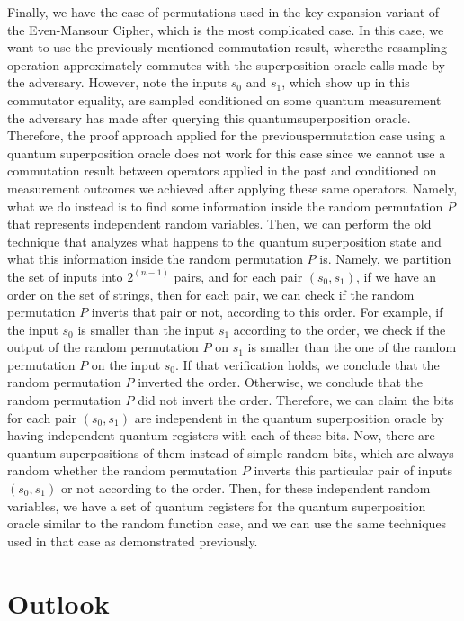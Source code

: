 \documentclass[12pt]{article}
\begin{document}
    Finally, we have the case of permutations used in the key expansion variant of the Even-Mansour Cipher, which is the most complicated case. In this case, we want to use the previously mentioned commutation result, where\break the resampling operation approximately commutes with the superposition oracle calls made by the adversary. However, note the inputs ${s}_{0}$ and ${s}_{1}$, which show up in this commutator equality, are sampled conditioned on some quantum measurement the adversary has made after querying this quantum\break superposition oracle. Therefore, the proof approach applied for the previous\break permutation case using a quantum superposition oracle does not work for this case since we cannot use a commutation result between operators applied in the past and conditioned on measurement outcomes we achieved after applying these same operators. Namely, what we do instead is to find some information inside the random permutation $P$ that represents independent random variables. Then, we can perform the old technique that analyzes what happens to the quantum superposition state and what this information inside the random permutation $P$ is. Namely, we partition the set of inputs into ${2}^{(n - 1)}$ pairs, and for each pair $({s}_{0}, {s}_{1})$, if we have an order on the set of strings, then for each pair, we can check if the random permutation $P$ inverts that pair or not, according to this order. For example, if the input ${s}_{0}$ is smaller than the input ${s}_{1}$ according to the order, we check if the output of the random permutation $P$ on ${s}_{1}$ is smaller than the one of the random permutation $P$ on the input ${s}_{0}$. If that verification holds, we conclude that the random permutation $P$ inverted the order. Otherwise, we conclude that the random permutation $P$ did not invert the order. Therefore, we can claim the bits for each pair $({s}_{0}, {s}_{1})$ are independent in the quantum superposition oracle by having independent quantum registers with each of these bits. Now, there are quantum superpositions of them instead of simple random bits, which are always random whether the random permutation $P$ inverts this particular pair of inputs $({s}_{0}, {s}_{1})$ or not according to the order. Then, for these independent random variables, we have a set of quantum registers for the quantum superposition oracle similar to the random function case, and we can use the same techniques used in that case as demonstrated previously.

    \section{Outlook}
    \label{sec:outlook}
\end{document}

